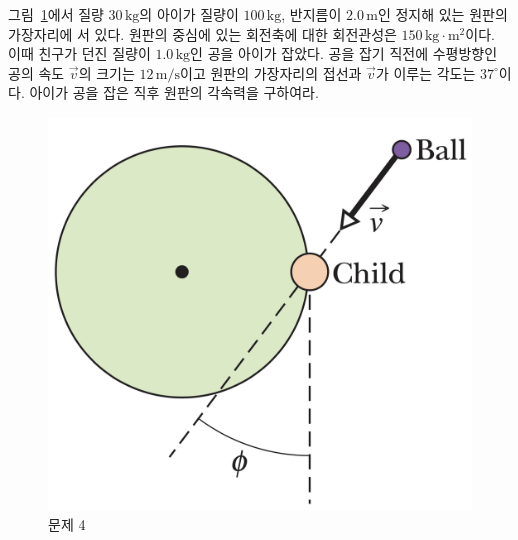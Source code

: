 \documentclass[floatfix,nofootinbib,superscriptaddress,fleqn]{revtex4-2}
\begin{document}
\vspace{1.cm}


그림~\ref{fig:4}에서 질량 $30\,\mathrm{kg}$의 아이가 질량이 $100\,\mathrm{kg}$, 반지름이 
$2.0\,\mathrm{m}$인 정지해 있는 원판의 가장자리에 서 있다. 원판의 중심에 있는 회전축에
대한 회전관성은 $150\,\mathrm{kg\cdot m^2}$이다. 이때 친구가 던진
질량이 $1.0\,\mathrm{kg}$인 공을 아이가 잡았다. 공을 잡기 직전에 수평방향인 공의
속도 $\vec{v}$의 크기는 $12\,\mathrm{m/s}$이고 원판의 가장자리의 접선과
$\vec{v}$가 이루는 각도는 $37^\circ$이다. 아이가 공을 잡은 직후 원판의
각속력을 구하여라. 
\begin{figure}[ht]
  \centering
\includegraphics[scale=0.25]{Qfig14-4-20220427.png} 
  \caption{문제 4}
  \label{fig:4}
\end{figure}
\end{document}
